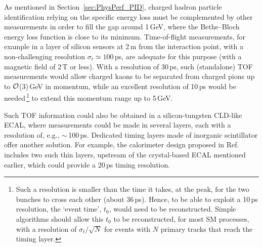 As mentioned in Section~\ref{sec:PhysPerf_PID}, 
charged hadron particle identification relying on the specific energy loss must be complemented by other measurements in order to fill the gap around 1\,GeV, 
where the Bethe--Bloch energy loss function is close to its minimum. 
Time-of-flight measurements, for example in a layer of silicon sensors at 2\,m from the interaction point, with a non-challenging resolution $\sigma_t \simeq 100$\,ps, 
are adequate for this purpose (with a magnetic field of 2\,T or less). 
With a resolution of 30\,ps, such (standalone) TOF measurements would allow charged kaons to be separated from charged pions up to ${\cal{O}}$(3)\,GeV in momentum, 
while an excellent resolution of 10\,ps would be 
needed\,\footnote{Such a resolution is smaller than the time it takes, at the \PZ peak, for the two bunches to cross each other (about 36\,ps). 
Hence, to be able to exploit a 10\,ps resolution, the `event time', $t_0$, would need to be reconstructed. 
Simple algorithms should allow this $t_0$ to be reconstructed, for most SM processes, 
with a resolution of $\sigma_t / \sqrt{N}$ for events with $N$ primary tracks that reach the timing layer.} 
to extend this momentum range up to 5\,GeV.  

Such TOF information could also be obtained in a silicon-tungsten CLD-like ECAL, 
where measurements could be made in several layers, each with a resolution of, e.g., $\sim$\,100\,ps. 
Dedicated timing layers made of inorganic scintillator offer another solution. 
For example, the calorimeter design proposed in Ref.~\cite{Lucchini:2020bac} includes two such thin layers, upstream of the crystal-based ECAL mentioned earlier, which could provide a 20\,ps timing resolution.  

